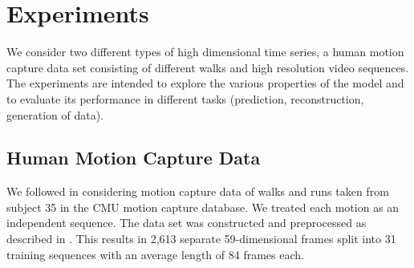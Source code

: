 \documentclass{article} %
\begin{document}
\section{Experiments}

We consider two different types of high dimensional time series, a
human motion capture data set consisting of different walks and high
resolution video sequences. The experiments are intended to explore
the various properties of the model and to evaluate its performance in
different tasks (prediction, reconstruction, generation of data). 

\subsection{Human Motion Capture Data}

We followed \cite{Taylor,gplvmLarger} in considering motion capture
data of walks and runs taken from subject 35 in the CMU motion capture
database. We treated each motion as an independent sequence.  The data
set was constructed and preprocessed as described in
\cite{gplvmLarger}. This results in 2,613 separate 59-dimensional
frames split into 31 training sequences with an average length of 84
frames each.
\end{document}
